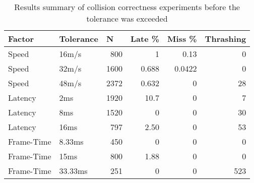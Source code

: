 \begin{table}
	\centering
	\begin{tabular}{llrrrr}
		\toprule
		\multicolumn{1}{l}{Factor} & \multicolumn{1}{l}{Tolerance} & \multicolumn{1}{l}{N} & \multicolumn{1}{l}{Late \%} & \multicolumn{1}{l}{Miss \%} & \multicolumn{1}{l}{Thrashing}  \\ 
		\hline
		Speed      & 16m/s     & 800  & 1     & 0.13       &    0             \\
		Speed      & 32m/s     & 1600 & 0.688 & 0.0422     &    0             \\
		Speed      & 48m/s     & 2372  & 0.632& 0          &    28            \\
		Latency    & 2ms       & 1920  & 10.7 & 0          &    7             \\
		Latency    & 8ms       & 1520  & 0    & 0          &    30            \\
		Latency    & 16ms      & 797  & 2.50  & 0          &    53            \\
		Frame-Time & 8.33ms    & 450  & 0     & 0          &    0             \\
		Frame-Time & 15ms      & 800  & 1.88  & 0          &    0             \\
		Frame-Time & 33.33ms   & 251  & 0     & 0          &    523           \\
		\bottomrule
	\end{tabular}
	\caption{Results summary of collision correctness experiments before the tolerance was exceeded}
	\label{tab_BelowTolerance}
\end{table}

